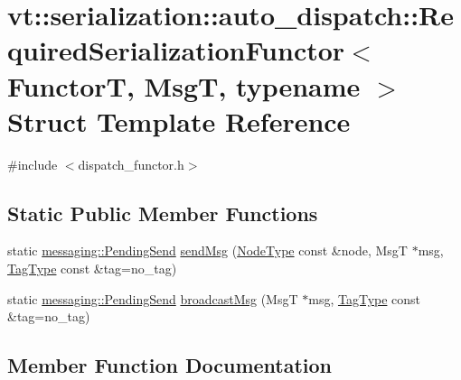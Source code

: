 \hypertarget{structvt_1_1serialization_1_1auto__dispatch_1_1_required_serialization_functor}{}\section{vt\+:\+:serialization\+:\+:auto\+\_\+dispatch\+:\+:Required\+Serialization\+Functor$<$ FunctorT, MsgT, typename $>$ Struct Template Reference}
\label{structvt_1_1serialization_1_1auto__dispatch_1_1_required_serialization_functor}


{\ttfamily \#include $<$dispatch\+\_\+functor.\+h$>$}

\subsection*{Static Public Member Functions}
\begin{DoxyCompactItemize}
\item 
static \hyperlink{structvt_1_1messaging_1_1_pending_send}{messaging\+::\+Pending\+Send} \hyperlink{structvt_1_1serialization_1_1auto__dispatch_1_1_required_serialization_functor_a6e5a4c21ff3aca953e489f51a4f3189e}{send\+Msg} (\hyperlink{namespacevt_a866da9d0efc19c0a1ce79e9e492f47e2}{Node\+Type} const \&node, MsgT $\ast$msg, \hyperlink{namespacevt_a84ab281dae04a52a4b243d6bf62d0e52}{Tag\+Type} const \&tag=no\+\_\+tag)
\item 
static \hyperlink{structvt_1_1messaging_1_1_pending_send}{messaging\+::\+Pending\+Send} \hyperlink{structvt_1_1serialization_1_1auto__dispatch_1_1_required_serialization_functor_a517681e5be8e0272577c2f8ee33eb5b2}{broadcast\+Msg} (MsgT $\ast$msg, \hyperlink{namespacevt_a84ab281dae04a52a4b243d6bf62d0e52}{Tag\+Type} const \&tag=no\+\_\+tag)
\end{DoxyCompactItemize}


\subsection{Member Function Documentation}
\mbox{\label{structvt_1_1serialization_1_1auto__dispatch_1_1_required_serialization_functor_a517681e5be8e0272577c2f8ee33eb5b2}} 
